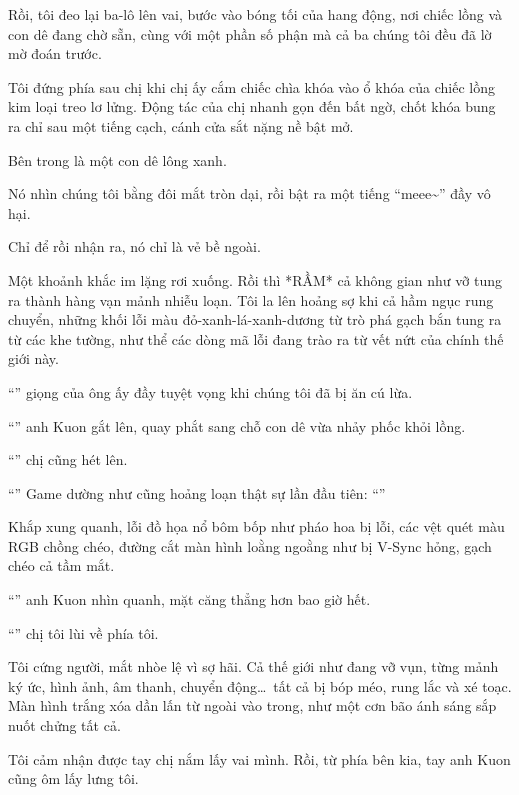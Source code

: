 \documentclass[../main.tex]{subfiles}
\begin{document}
Rồi, tôi đeo lại ba-lô lên vai, bước vào bóng tối của hang động, nơi chiếc lồng và con dê đang chờ sẵn, cùng với một phần số phận mà cả ba chúng tôi đều đã lờ mờ đoán trước.


Tôi đứng phía sau chị khi chị ấy cắm chiếc chìa khóa vào ổ khóa của chiếc lồng kim loại treo lơ lửng. Động tác của chị nhanh gọn đến bất ngờ, chốt khóa bung ra chỉ sau một tiếng cạch, cánh cửa sắt nặng nề bật mở.

Bên trong là một con dê lông xanh.

Nó nhìn chúng tôi bằng đôi mắt tròn dại, rồi bật ra một tiếng ``meee\~{}'' đầy vô hại.

Chỉ để rồi nhận ra, nó chỉ là vẻ bề ngoài.

Một khoảnh khắc im lặng rơi xuống. Rồi thì *RẦM* cả không gian như vỡ tung ra thành hàng vạn mảnh nhiễu loạn. Tôi la lên hoảng sợ khi cả hầm ngục rung chuyển, những khối lỗi màu đỏ-xanh-lá-xanh-dương từ trò phá gạch bắn tung ra từ các khe tường, như thể các dòng mã lỗi đang trào ra từ vết nứt của chính thế giới này.


``'' giọng của ông ấy đầy tuyệt vọng khi chúng tôi đã bị ăn cú lừa.

``'' anh Kuon gắt lên, quay phắt sang chỗ con dê vừa nhảy phốc khỏi lồng.

``'' chị cũng hét lên.

``'' Game dường như cũng hoảng loạn thật sự lần đầu tiên: ``''

Khắp xung quanh, lỗi đồ họa nổ bôm bốp như pháo hoa bị lỗi, các vệt quét màu RGB chồng chéo, đường cắt màn hình loằng ngoằng như bị V-Sync hỏng, gạch chéo cả tầm mắt.

``'' anh Kuon nhìn quanh, mặt căng thẳng hơn bao giờ hết.

``'' chị tôi lùi về phía tôi.

Tôi cứng người, mắt nhòe lệ vì sợ hãi. Cả thế giới như đang vỡ vụn, từng mảnh ký ức, hình ảnh, âm thanh, chuyển động\dots\ tất cả bị bóp méo, rung lắc và xé toạc. Màn hình trắng xóa dần lấn từ ngoài vào trong, như một cơn bão ánh sáng sắp nuốt chửng tất cả.

Tôi cảm nhận được tay chị nắm lấy vai mình. Rồi, từ phía bên kia, tay anh Kuon cũng ôm lấy lưng tôi.
\end{document}
